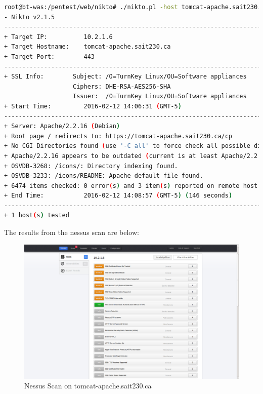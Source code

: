 \documentclass{article}
\begin{document}
\begin{lstlisting}[language=Bash]
root@bt-was:/pentest/web/nikto# ./nikto.pl -host tomcat-apache.sait230.ca -p 443
- Nikto v2.1.5
---------------------------------------------------------------------------
+ Target IP:          10.2.1.6
+ Target Hostname:    tomcat-apache.sait230.ca
+ Target Port:        443
---------------------------------------------------------------------------
+ SSL Info:        Subject: /O=TurnKey Linux/OU=Software appliances
                   Ciphers: DHE-RSA-AES256-SHA
                   Issuer:  /O=TurnKey Linux/OU=Software appliances
+ Start Time:         2016-02-12 14:06:31 (GMT-5)
---------------------------------------------------------------------------
+ Server: Apache/2.2.16 (Debian)
+ Root page / redirects to: https://tomcat-apache.sait230.ca/cp
+ No CGI Directories found (use '-C all' to force check all possible dirs)
+ Apache/2.2.16 appears to be outdated (current is at least Apache/2.2.19). Apache 1.3.42 (final release) and 2.0.64 are also current.
+ OSVDB-3268: /icons/: Directory indexing found.
+ OSVDB-3233: /icons/README: Apache default file found.
+ 6474 items checked: 0 error(s) and 3 item(s) reported on remote host
+ End Time:           2016-02-12 14:08:57 (GMT-5) (146 seconds)
---------------------------------------------------------------------------
+ 1 host(s) tested
\end{lstlisting}

The results from the nessus scan are below:

\begin{figure}[h!]
	\includegraphics[width=\linewidth]{images/nessus-tomcat.png}
	\caption{Nessus Scan on tomcat-apache.sait230.ca}
	\label{fig:nessus-tomcat}
\end{figure}
\end{document}

